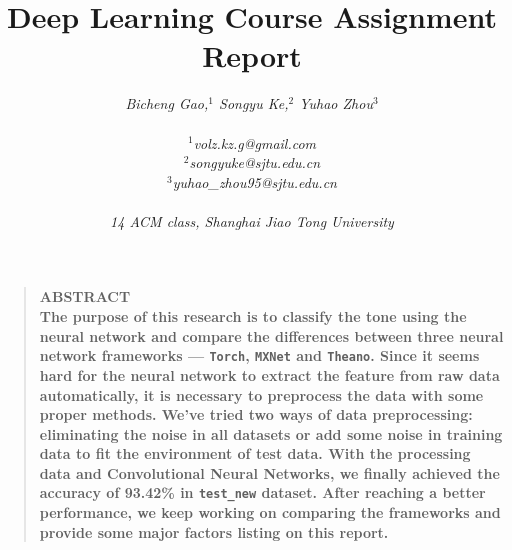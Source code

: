 \documentclass[12pt]{article}
\title{{\bf Deep Learning Course Assignment Report}}
\author
{{\it Bicheng Gao,$^{1}$ Songyu Ke,$^{2}$ Yuhao Zhou$^{3}$}\\
\\
\normalsize{{\it $^{1}$volz.kz.g@gmail.com}}\\
\normalsize{{\it $^{2}$songyuke@sjtu.edu.cn}}\\
\normalsize{{\it $^{3}$yuhao\_zhou95@sjtu.edu.cn}}\\
\\
\normalsize{{\it 14 ACM class, Shanghai Jiao Tong University}}
}
\date{}
\newenvironment{sciabstract}{%
\begin{quote} \bf}
{\end{quote}}
\begin{document}
 


\baselineskip24pt


\maketitle 




\begin{sciabstract}
{\bf ABSTRACT} \\
The purpose of this research is to classify the tone using the neural network and compare the differences between three neural network frameworks --- \texttt{Torch}, \texttt{MXNet} and \texttt{Theano}. Since it seems hard for the neural network to extract the feature from raw data automatically, it is necessary to preprocess the data with some proper methods. We've tried two ways of data preprocessing: eliminating the noise in all datasets or add some noise in training data to fit the environment of test data. With the processing data and Convolutional Neural Networks, we finally achieved the accuracy of {93.42\%} in \texttt{test\_new} dataset. After reaching a better performance, we keep working on comparing the frameworks and provide some major factors listing on this report.
\end{sciabstract}

\end{document}
